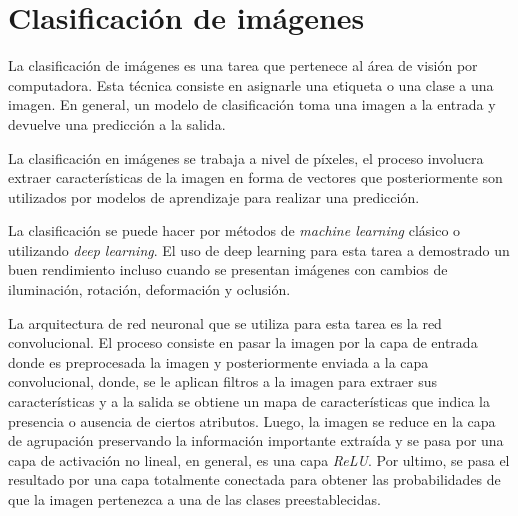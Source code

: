 \section{Clasificación de imágenes}

La clasificación de imágenes es una tarea que pertenece al área de visión por computadora. Esta técnica consiste en asignarle una etiqueta o una clase a una imagen. En general, un modelo de clasificación toma una imagen a la entrada y devuelve una predicción a la salida. 

La clasificación en imágenes se trabaja a nivel de píxeles, el proceso involucra extraer características de la imagen en forma de vectores que posteriormente son utilizados por modelos de aprendizaje para realizar una predicción. 

La clasificación se puede hacer por métodos de \textit{machine learning} clásico o utilizando \textit{deep learning}. El uso de deep learning para esta tarea a demostrado un buen rendimiento incluso cuando se presentan imágenes con cambios de iluminación, rotación, deformación y oclusión.

La arquitectura de red neuronal que se utiliza para esta tarea es la red convolucional. El proceso consiste en pasar la imagen por la capa de entrada donde es preprocesada la imagen y posteriormente enviada a la capa convolucional, donde, se le aplican filtros a la imagen para extraer sus características y a la salida se obtiene un mapa de características que indica la presencia o ausencia de ciertos atributos. Luego, la imagen se reduce en la capa de agrupación preservando la información importante extraída y se pasa por una capa de activación no lineal, en general, es una capa \textit{ReLU}. Por ultimo, se pasa el resultado por una capa totalmente conectada para obtener las probabilidades de que la imagen pertenezca a una de las clases preestablecidas. 


